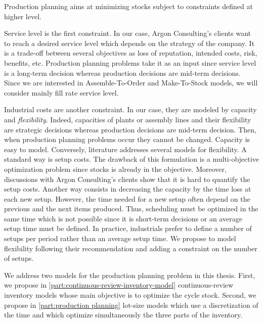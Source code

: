 \medskip


Production planning aims at minimizing  stocks subject to constraints defined at higher level.


Service level is the first constraint.
In our case, Argon Consulting's clients want to reach a desired service level which depends on the strategy of the company.
It is a trade-off between several objectives as loss of reputation, intended costs, risk, benefits, etc.
Production planning problems take it as an input since service level is a long-term decision whereas production decisions are mid-term decisions.
Since we are interested in Assemble-To-Order and Make-To-Stock models, we will consider mainly fill rate service level. 


Industrial costs are another constraint.
In our case, they are modeled by capacity and \emph{flexibility}.
Indeed, capacities of plants or assembly lines and their flexibility are strategic decisions whereas production decisions are mid-term decision.
Then, when production planning problems occur they cannot be changed.
Capacity  is easy to model.
Conversely, literature addresses several models for flexibility.
A standard way is setup costs.
The drawback of this formulation is a multi-objective optimization problem since stocks is already in the objective.
Moreover, discussions with Argon Consulting's clients show that it is hard to quantify the setup costs.
Another way consists in decreasing the capacity by the time loss at each new setup.
However, the time needed for a new setup often depend on the previous and the next items produced.
Thus, scheduling must be optimized in the same time which is not possible since it is short-term decisions  or an average setup time must be defined.
In practice, industrials prefer to define a number of setups per period rather than an average setup time.
We propose to model flexibility following their recommendation and adding a constraint on the number of setups.


\medskip


We address two models for the production planning problem in this thesis.
First, we propose in \cref{part:continuous-review-inventory-model} continuous-review inventory models whose main objective is to optimize the cycle stock.
Second, we propose in \cref{part:production planning} lot-size models which use a discretization of the time and which optimize simultaneously the three parts of the inventory.



